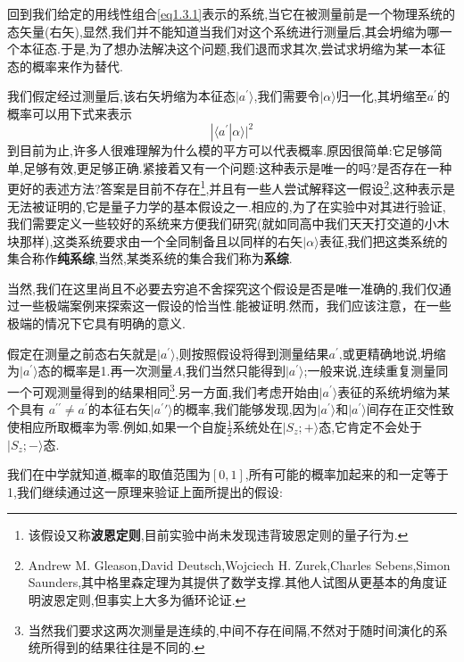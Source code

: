 \documentclass[lang=cn,newtx,10pt,scheme=chinese,thmcnt=section]{elegantbook}
\begin{document}
回到我们给定的用线性组合\ref{eq1.3.1}表示的系统,当它在被测量前是一个物理系统的态矢量(右矢),显然,我们并不能知道当我们对这个系统进行测量后,其会坍缩为哪一个本征态.于是,为了想办法解决这个问题,我们退而求其次,尝试求坍缩为某一本征态的概率来作为替代.

我们假定经过测量后,该右矢坍缩为本征态$|a^{'}\rangle$,我们需要令$|\alpha\rangle$归一化,其坍缩至$a^{'}$的概率可以用下式来表示
\begin{equation}
	|\langle a^{\prime}|\alpha\rangle|^{2}
\end{equation}
到目前为止,许多人很难理解为什么模的平方可以代表概率.原因很简单:它足够简单,足够有效,更足够正确.紧接着又有一个问题:这种表示是唯一的吗?是否存在一种更好的表述方法?答案是目前不存在\footnote{该假设又称\textbf{波恩定则},目前实验中尚未发现违背玻恩定则的量子行为.},并且有一些人尝试解释这一假设\footnote{Andrew M. Gleason,David Deutsch,Wojciech H. Zurek,Charles Sebens,Simon Saunders,其中格里森定理为其提供了数学支撑.其他人试图从更基本的角度证明波恩定则,但事实上大多为循环论证.},这种表示是无法被证明的,它是量子力学的基本假设之一.相应的,为了在实验中对其进行验证,我们需要定义一些较好的系统来方便我们研究(就如同高中我们天天打交道的小木块那样),这类系统要求由一个全同制备且以同样的右矢$|\alpha\rangle$表征,我们把这类系统的集合称作\textbf{纯系综},当然,某类系统的集合我们称为\textbf{系综}.

当然,我们在这里尚且不必要去穷追不舍探究这个假设是否是唯一准确的,我们仅通过一些极端案例来探索这一假设的恰当性.能被证明.然而，我们应该注意，在一些极端的情况下它具有明确的意义.

假定在测量之前态右矢就是$|a^\prime\rangle$,则按照假设将得到测量结果$a^\prime$,或更精确地说,坍缩为$|a^{\prime}\rangle$态的概率是1.再一次测量$A$,我们当然只能得到$|a^{\prime}\rangle$;一般来说,连续重复测量同一个可观测量得到的结果相同\footnote{当然我们要求这两次测量是连续的,中间不存在间隔,不然对于随时间演化的系统所得到的结果往往是不同的.}.另一方面,我们考虑开始由$|a^\prime\rangle$表征的系统坍缩为某个具有 $a^{\prime\prime}\neq a^{\prime}$的本征右矢$|a^\prime\prime\rangle$的概率,我们能够发现,因为$|a^\prime\rangle$和$|a^\prime\rangle$间存在正交性致使相应所取概率为零.例如,如果一个自旋$\frac12$系统处在$|S_z;+\rangle$态,它肯定不会处于$|S_{z};-\rangle$态.

我们在中学就知道,概率的取值范围为$[0,1]$,所有可能的概率加起来的和一定等于1,我们继续通过这一原理来验证上面所提出的假设:
\end{document}
